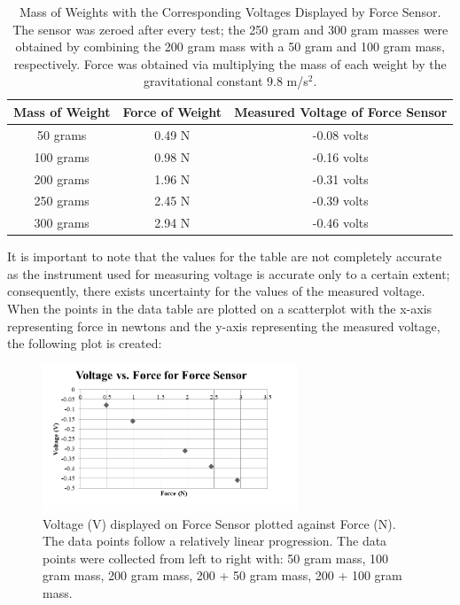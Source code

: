 \documentclass[titlepage]{article}
\begin{document}
\begin{table}[!htbp]
\renewcommand{\arraystretch}{1.3}
\centering
\begin{tabular}{c|c|c}
    \hline
    \hline
    Mass of Weight  &  Force of Weight  &  Measured Voltage of Force Sensor\\
    \hline
    \hline

    50 grams   &   0.49 N  &  -0.08 volts\\
    \hline

    100 grams    &   0.98 N  &  -0.16 volts\\
    \hline

    200 grams  &  1.96 N  &  -0.31 volts\\
    \hline

    250 grams  &  2.45 N  &  -0.39 volts\\
    \hline

    300 grams  &  2.94 N  &  -0.46 volts\\
    \hline
\end{tabular}
\caption{Mass of Weights with the Corresponding Voltages Displayed by Force Sensor. The sensor was zeroed after every test; the 250 gram and 300 gram masses were obtained by combining the 200 gram mass with a 50 gram and 100 gram mass, respectively. Force was obtained via multiplying the mass of each weight by the gravitational constant 9.8 m/{s}$^2$.}
\label{tab:1}
\end{table}

It is important to note that the values for the table are not completely accurate as the instrument used for measuring voltage is accurate only to a certain extent; consequently, there exists uncertainty for the values of the measured voltage.
When the points in the data table are plotted on a scatterplot with the x-axis representing force in newtons and the y-axis representing the measured voltage, the following plot is created:

\begin{figure}[!htbp]
    \centering
    \includegraphics[width=3.0in]{Scatterplot.png}
    \caption{Voltage (V) displayed on Force Sensor plotted against Force (N). The data points follow a relatively linear progression. The data points were collected from left to right with: 50 gram mass, 100 gram mass, 200 gram mass, 200 + 50 gram mass, 200 + 100 gram mass.}
    \label{fig:1}
\end{figure}
\end{document}
